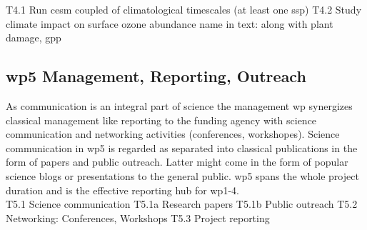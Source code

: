 T4.1 Run \gls{cesm} coupled of climatological timescales (at least one \gls{ssp})
T4.2 Study climate impact on surface ozone abundance 
name in text: along with plant damage, gpp

\subsection*{\gls{wp}5 Management, Reporting, Outreach}
\label{ssec:wp5}
As communication is an integral part of science the management \gls{wp} synergizes classical management like reporting to the funding agency with science communication and networking activities (conferences, workshopes). Science communication in \gls{wp}5 is regarded as separated into classical publications in the form of papers and public outreach. Latter might come in the form of popular science blogs or presentations to the general public. \gls{wp}5 spans the whole project duration and is the effective reporting hub for \gls{wp}1-4.\\
 
T5.1 Science communication
T5.1a Research papers
T5.1b Public outreach
T5.2 Networking: Conferences, Workshops
T5.3 Project reporting
